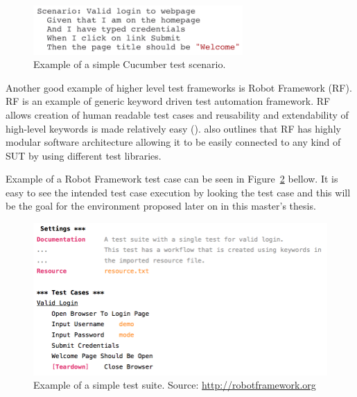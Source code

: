 \begin{figure}[ht]
  \begin{center}
    \includegraphics[width=8cm]{images/cucumber_example.png}
    \caption{Example of a simple Cucumber test scenario.}
    \label{fig:robot_example}
  \end{center}
\end{figure}
\FloatBarrier

Another good example of higher level test frameworks is Robot Framework (RF). RF is an example of generic keyword driven test automation framework. RF allows creation of human readable test cases and reusability and extendability of high-level keywords is made relatively easy (\emph{\cite{stresnjak2011usage}}). \emph{\cite{Rfuserguide}} also outlines that RF has highly modular software architecture allowing it to be easily connected to any kind of SUT by using different test libraries.

Example of a Robot Framework test case can be seen in Figure~\ref{fig:robot_example} bellow. It is easy to see the intended test case execution by looking the test case and this will be the goal for the environment proposed later on in this master's thesis.

\begin{figure}[ht]
  \begin{center}
    \includegraphics[width=12cm]{images/robot_example.png}
    \caption{Example of a simple test suite. Source: \url{http://robotframework.org}}
    \label{fig:robot_example}
  \end{center}
\end{figure}
\FloatBarrier
